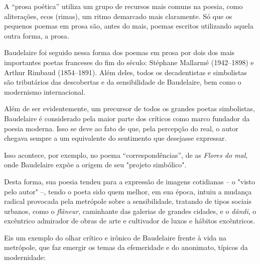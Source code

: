 \documentclass[12pt]{extarticle}
\begin{document}
A “prosa poética” utiliza um grupo de recursos mais comuns na poesia, como
aliterações, ecos (rimas), um ritmo demarcado mais claramente.
Só que os pequenos poemas em prosa são, antes do mais, poemas escritos
utilizando aquela outra forma, a prosa.
 
Baudelaire foi seguido nessa forma dos poemas em prosa por dois dos mais
importantes poetas franceses do fim do século: Stéphane Mallarmé (1942--1898) 
e Arthur Rimbaud (1854--1891).
Além deles, todos os decadentistas e simbolistas são tributários das
descobertas e da sensibilidade de Baudelaire, bem como o modernismo
internacional.

Além de ser evidentemente, um precursor de todos os grandes poetas simbolistas,
Baudelaire é considerado pela maior parte dos críticos como marco fundador da
poesia moderna. Isso se deve ao fato de que, pela percepção do real, o autor chegava
sempre a um equivalente do sentimento que desejasse expressar. 

Isso acontece, por exemplo, no poema “correspondências”, de as \textit{Flores do mal},
onde Baudelaire expõe a origem de seu "projeto simbólico". 
 
Desta forma, sua poesia tendeu para a expressão de imagens cotidianas -- o "visto
pelo autor" --, tendo o poeta sido quem melhor, em sua época, intuiu a mudança
radical provocada pela metrópole sobre a sensibilidade, tratando de tipos
sociais urbanos, como o \textit{flâneur}, caminhante das galerias de grandes cidades,
e o \textit{dândi}, o excêntrico admirador de obras de arte e cultivador de luxos e
hábitos excêntricos.


Eis um exemplo do olhar crítico e irônico de Baudelaire frente à vida na metrópole,
que faz emergir os temas da efemeridade e do anonimato, típicos da modernidade:
 
\end{document}
